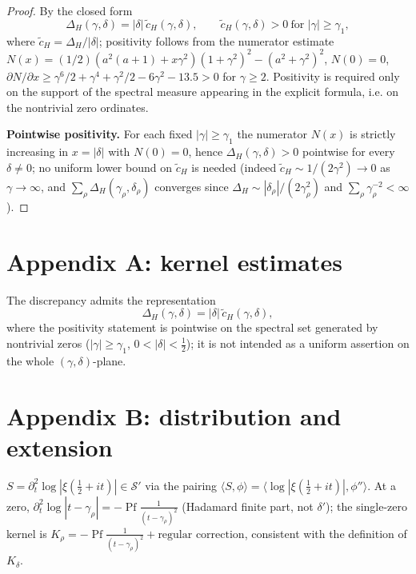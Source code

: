 \documentclass[11pt]{article}
\begin{document}
\begin{proof}
By the closed form
\begin{equation}
\Delta_H(\gamma,\delta)
=
|\delta|\,\widetilde c_H(\gamma,\delta),
\qquad
\widetilde c_H(\gamma,\delta)>0
\ \text{for } |\gamma|\ge\gamma_1,
\end{equation}
where $\widetilde c_H=\Delta_H/|\delta|$; positivity follows from the
numerator estimate $N(x)=(1/2)(a^2(a+1)+x\gamma^2)(1+\gamma^2)^2-
(a^2+\gamma^2)^2$, $N(0)=0$, $\partial N/\partial x\ge
\gamma^6/2+\gamma^4+\gamma^2/2-6\gamma^2-13.5>0$ for $\gamma\ge2$.
Positivity is required only on the support of the spectral measure
appearing in the explicit formula, i.e. on the nontrivial zero ordinates.

\noindent\textbf{Pointwise positivity.} For each fixed $|\gamma|\ge\gamma_1$
the numerator $N(x)$ is strictly increasing in $x=|\delta|$ with
$N(0)=0$, hence $\Delta_H(\gamma,\delta)>0$ pointwise for every
$\delta\ne0$; no uniform lower bound on $\widetilde c_H$ is needed
(indeed $\widetilde c_H\sim 1/(2\gamma^2)\to0$ as $\gamma\to\infty$, and
$\sum_\rho\Delta_H(\gamma_\rho,\delta_\rho)$ converges since
$\Delta_H\sim |\delta_\rho|/(2\gamma_\rho^2)$ and $\sum_\rho
\gamma_\rho^{-2}<\infty$).
\end{proof}

\appendix
\section{Appendix A: kernel estimates}
The discrepancy admits the representation
\begin{equation}
\Delta_H(\gamma,\delta)=|\delta|\,\widetilde c_H(\gamma,\delta),
\end{equation}
where the positivity statement is pointwise on the spectral set
generated by nontrivial zeros ($|\gamma|\ge\gamma_1$, $0<|\delta|<\tfrac12$);
it is not intended as a uniform assertion on the whole
$(\gamma,\delta)$-plane.

\section{Appendix B: distribution and extension}
$S=\partial_t^2\log|\xi(\tfrac12+it)|\in\mathcal S'$ via the pairing
$\langle S,\phi\rangle=\langle \log|\xi(\tfrac12+it)|,\phi''\rangle$.
At a zero, $\partial_t^2\log|t-\gamma_\rho|=-\operatorname{Pf}
\frac{1}{(t-\gamma_\rho)^2}$ (Hadamard finite part, not $\delta'$); the
single-zero kernel is
$K_\rho=-\operatorname{Pf}\frac{1}{(t-\gamma_\rho)^2}+\text{regular
correction}$, consistent with the definition of $K_\delta$.
\end{document}
